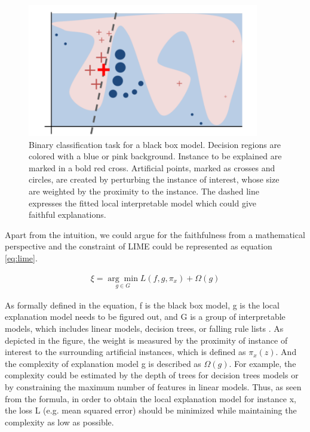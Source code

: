 \begin{figure}[H]%
	\includegraphics[width=0.9\textwidth]{imgs/lime.png}
	\caption{Binary classification task for a black box model. Decision regions are colored with a blue or pink background. Instance to be explained are marked in a bold red cross. Artificial points, marked as crosses and circles, are created by perturbing the instance of interest, whose size are weighted by the proximity to the instance. The dashed line expresses the fitted local interpretable model which could give faithful explanations.}
	\label{fig:lime}
\end{figure}

Apart from the intuition, we could argue for the faithfulness from a mathematical perspective and the constraint of LIME could be represented as equation \ref{eq:lime}. 

\begin{equation} \label{eq:lime}
\begin{gathered}
\xi=\underset{g \in {G}}{\arg \min } L\left(f, g, \pi_{x}\right)+\Omega(g)
\end{gathered}
\end{equation}

As formally defined in the equation, f is the black box model, g is the local explanation model needs to be figured out, and G is a group of interpretable models, which includes linear models, decision trees, or falling rule lists \cite{wang2015falling}. As depicted in the figure, the weight is measured by the proximity of instance of interest to the surrounding artificial instances, which is defined as $\pi_{x}(z)$. And the complexity of explanation model g is described as $\Omega(g)$. For example, the complexity could be estimated by the depth of trees for decision trees models or by constraining the maximum number of features in linear models. Thus, as seen from the formula, in order to obtain the local explanation model for instance x, the loss L (e.g. mean squared error) should be minimized while maintaining the complexity as low as possible.

